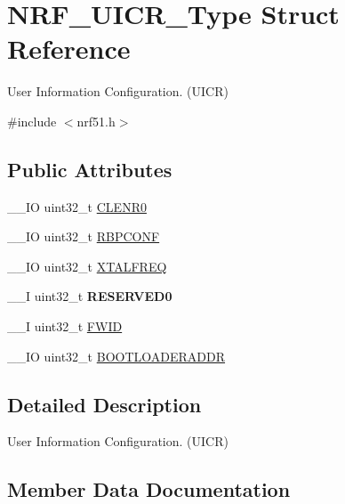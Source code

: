 \hypertarget{struct_n_r_f___u_i_c_r___type}{}\section{N\+R\+F\+\_\+\+U\+I\+C\+R\+\_\+\+Type Struct Reference}
\label{struct_n_r_f___u_i_c_r___type}


User Information Configuration. (U\+I\+C\+R)  




{\ttfamily \#include $<$nrf51.\+h$>$}

\subsection*{Public Attributes}
\begin{DoxyCompactItemize}
\item 
\+\_\+\+\_\+\+I\+O uint32\+\_\+t \hyperlink{struct_n_r_f___u_i_c_r___type_a525ea1f50cb00593232155f8a8a5f7fa}{C\+L\+E\+N\+R0}
\item 
\+\_\+\+\_\+\+I\+O uint32\+\_\+t \hyperlink{struct_n_r_f___u_i_c_r___type_aa0e2cc7eb94761f541cec70298b3b46c}{R\+B\+P\+C\+O\+N\+F}
\item 
\+\_\+\+\_\+\+I\+O uint32\+\_\+t \hyperlink{struct_n_r_f___u_i_c_r___type_a30dee3ac4cd33585413eaddb062a43a6}{X\+T\+A\+L\+F\+R\+E\+Q}
\item 
\hypertarget{struct_n_r_f___u_i_c_r___type_abaaec9ab426154f0da6763d9d220b6f5}{}\+\_\+\+\_\+\+I uint32\+\_\+t {\bfseries R\+E\+S\+E\+R\+V\+E\+D0}\label{struct_n_r_f___u_i_c_r___type_abaaec9ab426154f0da6763d9d220b6f5}

\item 
\+\_\+\+\_\+\+I uint32\+\_\+t \hyperlink{struct_n_r_f___u_i_c_r___type_ad41788e5c78a1227a2ec85a345233150}{F\+W\+I\+D}
\item 
\+\_\+\+\_\+\+I\+O uint32\+\_\+t \hyperlink{struct_n_r_f___u_i_c_r___type_af0860e87933bb29d82fd5e2fb33c95cd}{B\+O\+O\+T\+L\+O\+A\+D\+E\+R\+A\+D\+D\+R}
\end{DoxyCompactItemize}


\subsection{Detailed Description}
User Information Configuration. (U\+I\+C\+R) 

\subsection{Member Data Documentation}
\hypertarget{struct_n_r_f___u_i_c_r___type_af0860e87933bb29d82fd5e2fb33c95cd}{}
